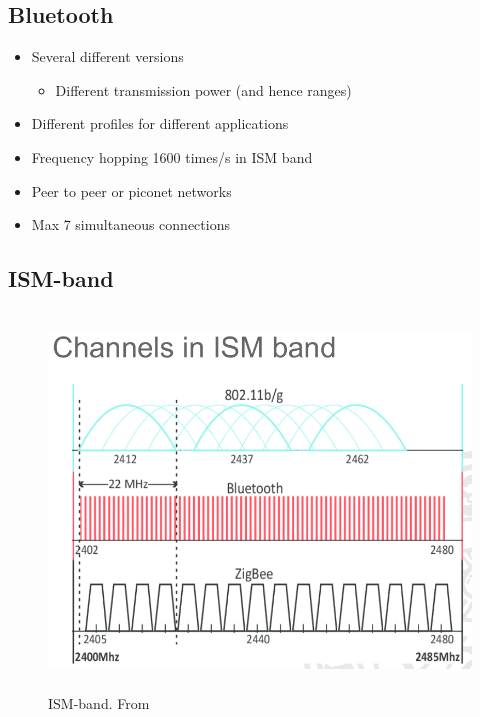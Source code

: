 \begin{multicols}{2}
\subsection{Bluetooth}
 \begin{itemize}
\item Several different versions
  \begin{itemize}
    \item Different transmission power (and hence ranges)
  \end{itemize}
\item Different profiles for different applications
\item Frequency hopping 1600 times/s in ISM band
\item Peer to peer or piconet networks
\item Max 7 simultaneous connections
\end{itemize}

\subsection{ISM-band}
\begin{figure}[h]
    \vspace{10mm}
    \centering
    \includegraphics[width=12cm, height=10cm]{image/ISM-band.png}
    \caption{ISM-band. From \cite{}}
\end{figure}


\end{multicols}
